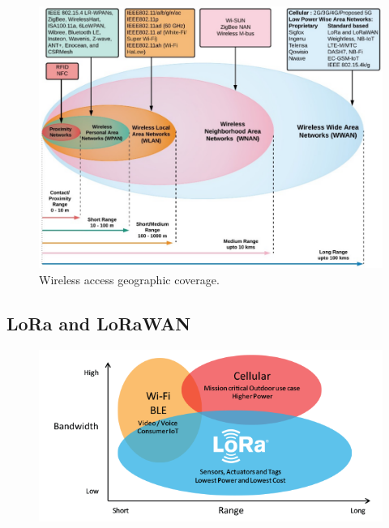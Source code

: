 	\begin{figure}[H]
		\centering
		\includegraphics[height=\textwidth, angle=90]{resources/img/iot_range}
		\caption[Wireless access geographic coverage.]{Wireless access geographic coverage. \cite{fi12030046}}
		\label{img:wireless_coverage}
	\end{figure}

	\newpage

	\subsection{LoRa and LoRaWAN}\label{subsec:lora_lorawan}
	
		
		\begin{figure}[H]
			\centering
			\includegraphics[width=\textwidth]{resources/img/LoRa_Why_Range}
			\caption{}
		\end{figure}
	
